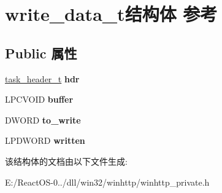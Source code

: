 \hypertarget{structwrite__data__t}{}\section{write\+\_\+data\+\_\+t结构体 参考}
\label{structwrite__data__t}
\subsection*{Public 属性}
\begin{DoxyCompactItemize}
\item 
\mbox{\label{structwrite__data__t_aa87bd24c106d242fe5f36f6cb128d65d}} 
\hyperlink{structtask__header__t}{task\+\_\+header\+\_\+t} {\bfseries hdr}
\item 
\mbox{\label{structwrite__data__t_a9d75d5d3516d626f09eb5d3a4ecb40c0}} 
L\+P\+C\+V\+O\+ID {\bfseries buffer}
\item 
\mbox{\label{structwrite__data__t_a23726bb7a6466281eb2e4dcb4bb0e590}} 
D\+W\+O\+RD {\bfseries to\+\_\+write}
\item 
\mbox{\label{structwrite__data__t_ab49b71cbf917efc0170576355f309237}} 
L\+P\+D\+W\+O\+RD {\bfseries written}
\end{DoxyCompactItemize}


该结构体的文档由以下文件生成\+:\begin{DoxyCompactItemize}
\item 
E\+:/\+React\+O\+S-\/0../dll/win32/winhttp/winhttp\+\_\+private.\+h\end{DoxyCompactItemize}
